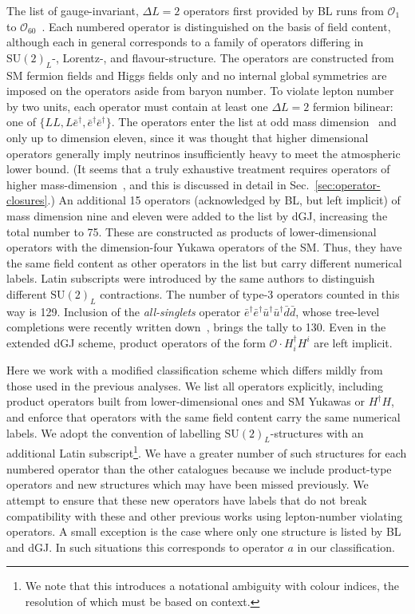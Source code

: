 The list of gauge-invariant, $\Delta L = 2$ operators first provided by BL runs
from $\mathcal{O}_1$ to $\mathcal{O}_{60}$~\cite{Babu:2001ex}. Each numbered
operator is distinguished on the basis of field content, although each in
general corresponds to a family of operators differing in $\mathrm{SU}(2)_{L}$-,
Lorentz-, and flavour-structure. The operators are constructed from SM fermion
fields and Higgs fields only and no internal global symmetries are imposed on
the operators aside from baryon number. To violate lepton number by two units,
each operator must contain at least one $\Delta L = 2$ fermion bilinear: one of
$\{LL, L\bar{e}^\dagger, \bar{e}^\dagger \bar{e}^\dagger\}$. The operators enter
the list at odd mass dimension~\cite{Kobach:2016ami} and only up to dimension
eleven, since it was thought that higher dimensional operators generally imply
neutrinos insufficiently heavy to meet the atmospheric lower bound. (It seems
that a truly exhaustive treatment requires operators of higher
mass-dimension~\cite{Gargalionis:2019drk}, and this is discussed in detail in
Sec.~\ref{sec:operator-closures}.) An additional 15 operators (acknowledged by
BL, but left implicit) of mass dimension nine and eleven were added to the list
by dGJ, increasing the total number to 75. These are constructed as products of
lower-dimensional operators with the dimension-four Yukawa operators of the SM.
Thus, they have the same field content as other operators in the list but carry
different numerical labels. Latin subscripts were introduced by the same authors
to distinguish different $\mathrm{SU}(2)_L$ contractions. The number of type-3
operators counted in this way is 129. Inclusion of the \textit{all-singlets}
operator
$\bar{e}^\dagger\bar{e}^\dagger \bar{u}^\dagger \bar{u}^\dagger \bar{d} \bar{d}$,
whose tree-level completions were recently written down~\cite{deGouvea:2019xzm},
brings the tally to 130. Even in the extended dGJ scheme, product operators of
the form $\mathcal{O} \cdot H^\dagger_i H^i$ are left implicit.

Here we work with a modified classification scheme which differs mildly from
those used in the previous analyses. We list all operators explicitly, including
product operators built from lower-dimensional ones and SM Yukawas or
$H^\dagger H$, and enforce that operators with the same field content carry the
same numerical labels. We adopt the convention of labelling
$\mathrm{SU}(2)_L$-structures with an additional Latin subscript\footnote{We
  note that this introduces a notational ambiguity with colour indices, the
  resolution of which must be based on context.}. We have a greater number of
such structures for each numbered operator than the other catalogues because we
include product-type operators and new structures which may have been missed
previously. We attempt to
ensure that these new operators have labels that do
not break compatibility with these and other previous works using lepton-number
violating operators. A small exception is the case where only one structure is
listed by BL and dGJ. In such situations this corresponds to operator $a$ in our
classification.

